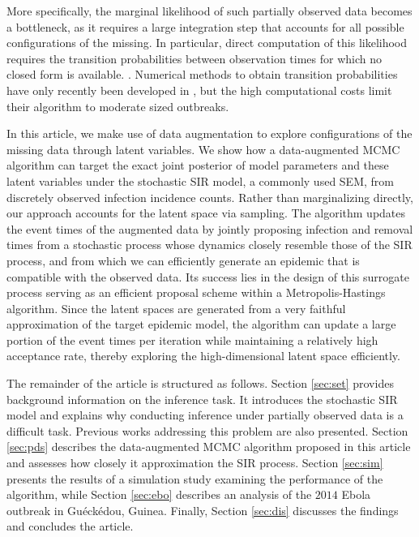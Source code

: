 \documentclass[11pt]{article}
\newcommand{\jx}[1]{{\color{blue}{ #1}}}
\begin{document}
	More specifically, the marginal likelihood of such partially observed data becomes a bottleneck, as it requires a large integration step that accounts for all possible configurations of the missing. In particular, direct computation of this likelihood requires the transition probabilities between observation times for which no closed form is available. \jx{to do: cite recent papers from Simon Spencer's group too that do so for discrete-time models, and mention classical matrix exponentiation being intractable}. Numerical methods to obtain transition probabilities have only recently been developed in \cite{Ho.2018b, Ho.2018}, but the high computational costs limit their algorithm to moderate sized outbreaks.
	
	In this article, we make use of data augmentation to explore configurations of the missing data through latent variables.  We show how a data-augmented MCMC algorithm can target the exact joint posterior of model parameters and these latent variables under the stochastic SIR model, a commonly used SEM, from discretely observed infection incidence counts. Rather than marginalizing directly, our approach accounts for the latent space via sampling. The algorithm updates the event times of the augmented data by jointly proposing infection and removal times from a stochastic process whose dynamics closely resemble those of the SIR process, and from which we can efficiently generate an epidemic that is compatible with the observed data. Its success lies in the design of this surrogate process serving as an efficient proposal scheme within a Metropolis-Hastings algorithm. Since the latent spaces are generated from a very faithful approximation of the target epidemic model, the algorithm can update a large portion of the event times per iteration while maintaining a relatively high acceptance rate, thereby exploring the high-dimensional latent space efficiently.
	
	The remainder of the article is structured as follows. Section \ref{sec:set} provides background information on the inference task. It introduces the stochastic SIR model and explains why conducting inference under partially observed data is a difficult task. Previous works addressing this problem are also presented. Section \ref{sec:pds} describes the data-augmented MCMC algorithm proposed in this article and assesses how closely it approximation the SIR process. Section \ref{sec:sim} presents the results of a simulation study examining the performance of the algorithm, while Section \ref{sec:ebo} describes an analysis of the $2014$ Ebola outbreak in Gu\'eck\'edou, Guinea. Finally, Section \ref{sec:dis} discusses the findings and concludes the article.
	
\end{document}
